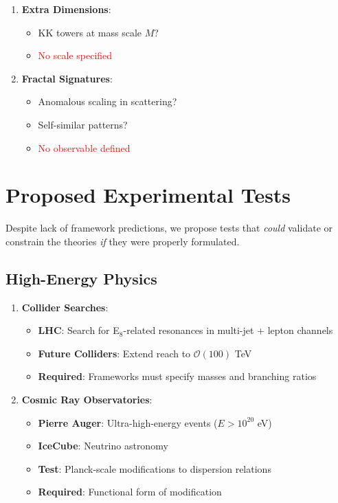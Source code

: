\begin{enumerate}
    \item \textbf{Extra Dimensions}:
    \begin{itemize}
        \item KK towers at mass scale $M$?
        \item \textcolor{red}{No scale specified}
    \end{itemize}

    \item \textbf{Fractal Signatures}:
    \begin{itemize}
        \item Anomalous scaling in scattering?
        \item Self-similar patterns?
        \item \textcolor{red}{No observable defined}
    \end{itemize}
\end{enumerate}

\section{Proposed Experimental Tests}

Despite lack of framework predictions, we propose tests that \textit{could} validate or constrain the theories \textit{if} they were properly formulated.

\subsection{High-Energy Physics}

\begin{enumerate}
    \item \textbf{Collider Searches}:
    \begin{itemize}
        \item \textbf{LHC}: Search for E$_8$-related resonances in multi-jet + lepton channels
        \item \textbf{Future Colliders}: Extend reach to $\mathcal{O}(100)$ TeV
        \item \textbf{Required}: Frameworks must specify masses and branching ratios
    \end{itemize}

    \item \textbf{Cosmic Ray Observatories}:
    \begin{itemize}
        \item \textbf{Pierre Auger}: Ultra-high-energy events ($E > 10^{20}$ eV)
        \item \textbf{IceCube}: Neutrino astronomy
        \item \textbf{Test}: Planck-scale modifications to dispersion relations
        \item \textbf{Required}: Functional form of modification
    \end{itemize}
\end{enumerate}

